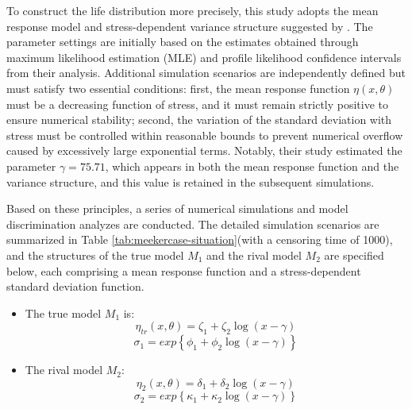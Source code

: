 \hspace*{8mm} To construct the life distribution more precisely, this study adopts the mean response model and stress-dependent variance structure suggested by \cite{pascual1997analysis}. The parameter settings are initially based on the estimates obtained through maximum likelihood estimation (MLE) and profile likelihood confidence intervals from their analysis. Additional simulation scenarios are independently defined but must satisfy two essential conditions: first, the mean response function $\eta(x,\theta)$  must be a decreasing function of stress, and it must remain strictly positive to ensure numerical stability; second, the variation of the standard deviation with stress must be controlled within reasonable bounds to prevent numerical overflow caused by excessively large exponential terms. Notably, their study estimated the parameter $\gamma=75.71$, which appears in both the mean response function and the variance structure, and this value is retained in the subsequent simulations.

\hspace*{8mm} Based on these principles, a series of numerical simulations and model discrimination analyzes are conducted. The detailed simulation scenarios are summarized in Table \ref{tab:meekercase-situation}(with a censoring time of 1000), and the structures of the true model $M_1$ and the rival model $M_2$ are specified below, each comprising a mean response function and a stress-dependent standard deviation function.

\begin{itemize}
\item The true model $M_1$ is:
\begin{equation}\label{meeker_truemodel}
\eta_{tr}(x,\theta)=\zeta_1+\zeta_2\log(x-\gamma)
\end{equation}
\begin{equation}\label{meeker_truemodel_variance}
\sigma_1=exp\left\{\phi_1+\phi_2\log(x-\gamma)\right\}
\end{equation}

\item The rival model $M_2$: 
\begin{equation}\label{meeker_rivalmodel}
\eta_2(x,\theta)=\delta_1+\delta_2\log(x-\gamma)
\end{equation}
\begin{equation}\label{meeker_truemodel_variance}
\sigma_2=exp\left\{\kappa_1+\kappa_2\log(x-\gamma)\right\}
\end{equation}

\end{itemize}

